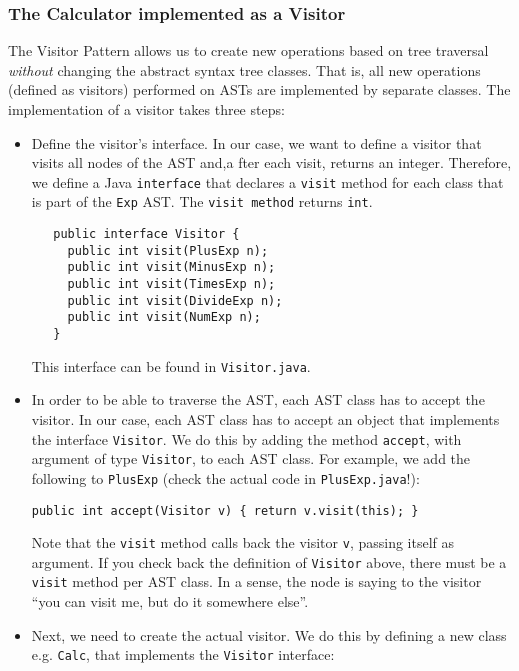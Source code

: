 \documentclass{article}
\begin{document}
\subsubsection*{The Calculator implemented as a Visitor}

The Visitor Pattern allows us to create new operations based on tree traversal \emph{without} changing the abstract syntax tree classes. That is, all new operations (defined as visitors) performed on ASTs are implemented by separate classes.
The implementation of a visitor takes three steps:

\begin{itemize}
\item Define the visitor's interface. In our case, we want to define a visitor that visits all nodes of the AST and,a fter each visit, returns an integer. Therefore, we define a Java {\tt interface} that declares a {\tt visit} method for each class that is part of the {\tt Exp} AST. The {\tt visit method} returns {\tt int}.

\begin{verbatim}
   public interface Visitor {
     public int visit(PlusExp n);
     public int visit(MinusExp n);
     public int visit(TimesExp n);
     public int visit(DivideExp n);
     public int visit(NumExp n);
   }
\end{verbatim}

This interface can be found in {\tt Visitor.java}.

\item In order to be able to traverse the AST, each AST class has to accept the visitor. In our case, each AST class has to accept an object that implements the interface {\tt Visitor}. We do this by adding the method {\tt accept}, with argument of type {\tt Visitor}, to each AST class. For example, we add the following to {\tt PlusExp} (check the actual code in {\tt PlusExp.java}!):

\begin{verbatim}
public int accept(Visitor v) { return v.visit(this); }
\end{verbatim}

Note that the {\tt visit} method calls back the visitor {\tt v}, passing itself as argument. If you check back the definition of {\tt Visitor} above, there must be a {\tt visit} method per AST class. In a sense, the node is saying to the visitor ``you can visit me, but do it somewhere else''.

\item Next, we need to create the actual visitor. We do this by defining a new class e.g. {\tt Calc}, that implements the {\tt Visitor} interface:


\end{itemize}
\end{document}
